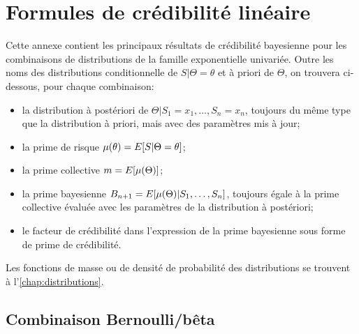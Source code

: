 \chapter{Formules de crédibilité linéaire}
\label{chap:formules}

Cette annexe contient les principaux résultats de crédibilité
bayesienne pour les combinaisons de distributions de la famille
exponentielle univariée. Outre les noms des distributions
conditionnelle de $S|\Theta = \theta$ et à priori de $\Theta$, on
trouvera ci-dessous, pour chaque combinaison:
\begin{itemize}
\item la distribution à postériori de
  $\Theta|S_1 = x_1, \dots, S_n = x_n$, toujours du même type que la
  distribution à priori, mais avec des paramètres mis à jour;
\item la prime de risque $\mu(\theta) = E [ S|\Theta = \theta ]$;
\item la prime collective $m = E [ \mu(\Theta) ]$;
\item la prime bayesienne
  $B_{n+1} = E [ \mu(\Theta)|S_1, \dots, S_n ]$, toujours égale à la
  prime collective évaluée avec les paramètres de la distribution à
  postériori;
\item le facteur de crédibilité dans l'expression de la prime
  bayesienne sous forme de prime de crédibilité.
\end{itemize}

Les fonctions de masse ou de densité de probabilité des distributions
se trouvent à l'\autoref{chap:distributions}.


\begingroup
{}

\section{Combinaison Bernoulli/bêta}

